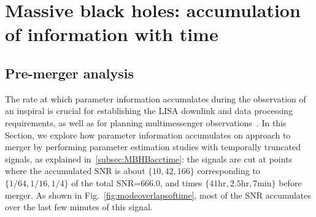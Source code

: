 \documentclass[aps,showpacs,twocolumn,prd,superscriptaddress,nofootinbib]{revtex4-1}
\newcommand{\be}{\begin{equation}}
\newcommand{\ee}{\end{equation}}
\newcommand\calA{{\mathcal{A}}}
\newcommand\varphiL{{\varphi_{L}}}
\newcommand\psiL{{\psi_{L}}}
\begin{document}
%
%


\section{Massive black holes: accumulation of information with time}
\label{sec:MBHBPEacctime}

\subsection{Pre-merger analysis}
\label{subsec:MBHBacctimePE}

The rate at which parameter information accumulates during the observation of an inspiral is crucial for establishing the LISA downlink and data processing requirements, as well as for planning multimessenger observations~\cite{ArmitageNatarajan02, DalCanton+19}.
In this Section, we explore how parameter information accumulates on approach to merger by performing parameter estimation studies with temporally truncated signals, as explained in~\ref{subsec:MBHBacctime}: the signals are cut at points where the accumulated SNR is about $\{10,42,166\}$ corresponding to $\{1/64,1/16,1/4\}$ of the total SNR=$666.0$, and times $\{41 \mathrm{hr}, 2.5 \mathrm{hr}, 7 \mathrm{min}\}$ before merger.
As shown in Fig.~\ref{fig:modeoverlapsoftime}, most of the SNR accumulates over the last few minutes of this signal.
\end{document}
